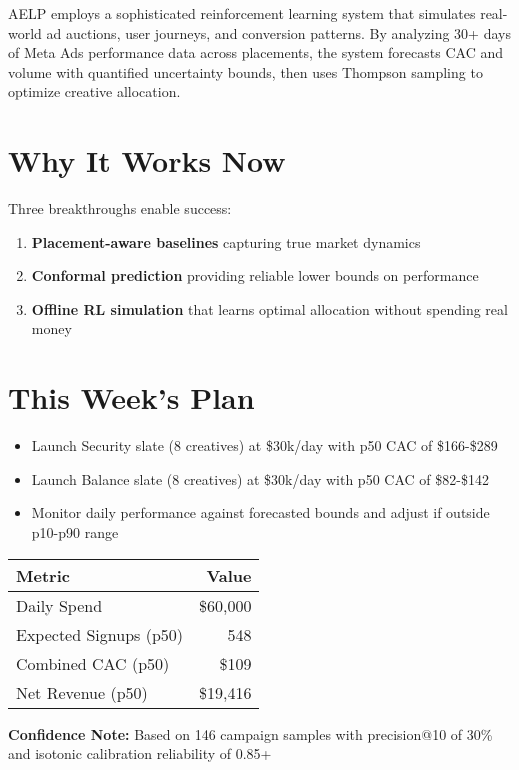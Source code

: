 \documentclass[11pt,a4paper]{report}
\begin{document}
AELP employs a sophisticated reinforcement learning system that simulates real-world ad auctions, user journeys, and conversion patterns. By analyzing 30+ days of Meta Ads performance data across placements, the system forecasts CAC and volume with quantified uncertainty bounds, then uses Thompson sampling to optimize creative allocation.

\section{Why It Works Now}

Three breakthroughs enable success:

\begin{enumerate}[itemsep=0.5em]
    \item \textbf{Placement-aware baselines} capturing true market dynamics
    \item \textbf{Conformal prediction} providing reliable lower bounds on performance
    \item \textbf{Offline RL simulation} that learns optimal allocation without spending real money
\end{enumerate}

\section{This Week's Plan}

\begin{itemize}[itemsep=0.5em]
    \item Launch Security slate (8 creatives) at \$30k/day with p50 CAC of \$166-\$289
    \item Launch Balance slate (8 creatives) at \$30k/day with p50 CAC of \$82-\$142
    \item Monitor daily performance against forecasted bounds and adjust if outside p10-p90 range
\end{itemize}

\begin{metricbox}
\begin{center}
\begin{tabular}{lr}
\toprule
\textbf{Metric} & \textbf{Value} \\
\midrule
Daily Spend & \$60,000 \\
Expected Signups (p50) & 548 \\
Combined CAC (p50) & \$109 \\
Net Revenue (p50) & \$19,416 \\
\bottomrule
\end{tabular}
\end{center}

\vspace{0.5em}
\textbf{Confidence Note:} Based on 146 campaign samples with precision@10 of 30\% and isotonic calibration reliability of 0.85+
\end{metricbox}
\end{document}

